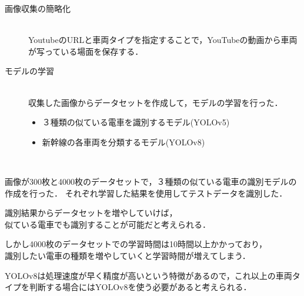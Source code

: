 


\begin{description}
	\item[画像収集の簡略化] ~\\
	YoutubeのURLと車両タイプを指定することで，YouTubeの動画から車両が写っている場面を保存する．
	\href{run:./fig/demo.mp4}{\textcolor[hsb]{0.0, 0.7, 1.0}{\faPlayCircle[regular]}}
	
	\item[モデルの学習]~\\
	収集した画像からデータセットを作成して，モデルの学習を行った．
	\begin{itemize}
		\item ３種類の似ている電車を識別するモデル(YOLOv5)
		\item 新幹線の各車両を分類するモデル(YOLOv8)
	\end{itemize}
\end{description}
\newpage



\begin{description}
	\item [似ている電車の識別] ~\\
	\item 画像が300枚と4000枚のデータセットで，３種類の似ている電車の識別モデルの作成を行った．
	それぞれ学習した結果を使用してテストデータを識別した．
	\href{run:./fig/hikaku/hikaku_demo.mp4}{\textcolor[hsb]{0.0, 0.7, 1.0}{\faPlayCircle[regular]}}\\
	\newpage
	
	\item 識別結果からデータセットを増やしていけば，\\似ている電車でも識別することが可能だと考えられる．
	\item しかし4000枚のデータセットでの学習時間は10時間以上かかっており，\\識別したい電車の種類を増やしていくと学習時間が増えてしまう．
	\item YOLOv8は処理速度が早く精度が高いという特徴があるので，これ以上の車両タイプを判断する場合にはYOLOv8を使う必要があると考えられる．
\end{description}


